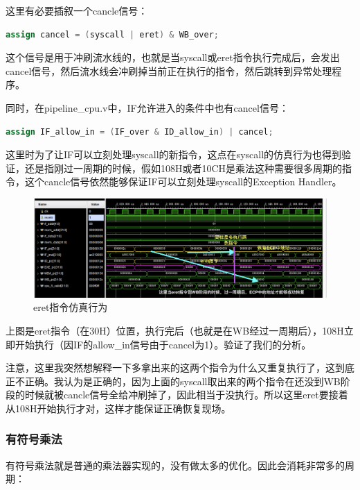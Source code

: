 \documentclass[a4paper]{article}
\begin{document}
这里有必要插叙一个cancle信号：


\begin{lstlisting}[language=Verilog, caption=cancel信号]
    assign cancel = (syscall | eret) & WB_over;
\end{lstlisting}

这个信号是用于冲刷流水线的，也就是当syscall或eret指令执行完成后，会发出cancel信号，然后流水线会冲刷掉当前正在执行的指令，然后跳转到异常处理程序。


同时，在pipeline\_cpu.v中，IF允许进入的条件中也有cancel信号：

\begin{lstlisting}[language=Verilog, caption=cancel信号]
    assign IF_allow_in = (IF_over & ID_allow_in) | cancel;
\end{lstlisting}

这里时为了让IF可以立刻处理syscall的新指令，这点在syscall的仿真行为也得到验证，还是指刚过一周期的时候，假如108H或者10CH是乘法这种需要很多周期的指令，这个cancle信号依然能够保证IF可以立刻处理syscall的Exception Handler。


\begin{figure}[H]
    \centering
    \includegraphics[width=\textwidth]{img/复现流水线仿真/eret指令分析.png}
    \caption{eret指令仿真行为}
\end{figure}

上图是eret指令（在30H）位置，执行完后（也就是在WB经过一周期后），108H立即开始执行（因IF的allow\_in信号由于cancel为1）。验证了我们的分析。

注意，这里我突然想解释一下多拿出来的这两个指令为什么又重复执行了，这到底正不正确。我认为是正确的，因为上面的syscall取出来的两个指令在还没到WB阶段的时候就被cancle信号全给冲刷掉了，因此相当于没执行。所以这里eret要接着从108H开始执行才对，这样才能保证正确恢复现场。

\subsubsection{有符号乘法}

有符号乘法就是普通的乘法器实现的，没有做太多的优化。因此会消耗非常多的周期：
\end{document}
